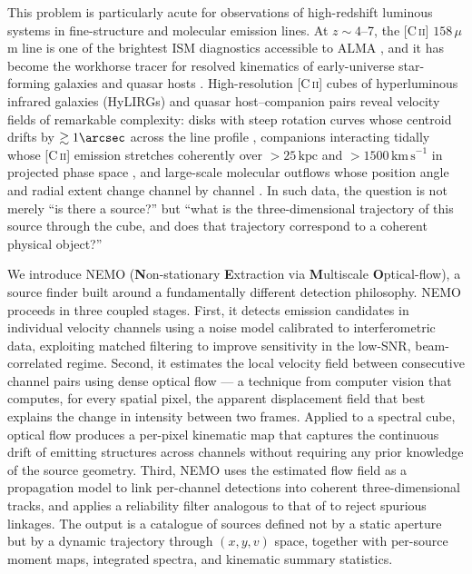 This problem is particularly acute for observations of high-redshift luminous systems in fine-structure and molecular emission lines. At $z \sim 4$--7, the [C\,\textsc{ii}] $158\,\mu$m line is one of the brightest ISM diagnostics accessible to ALMA \citep{Carilli2013}, and it has become the workhorse tracer for resolved kinematics of early-universe star-forming galaxies and quasar hosts \citep{Venemans2020, Decarli2021}. High-resolution [C\,\textsc{ii}] cubes of hyperluminous infrared galaxies (HyLIRGs) and quasar host--companion pairs reveal velocity fields of remarkable complexity: disks with steep rotation curves whose centroid drifts by $\gtrsim 1\arcsec$ across the line profile \citep{Venemans2020}, companions interacting tidally whose [C\,\textsc{ii}] emission stretches coherently over $>25\,\mathrm{kpc}$ and $>1500\,\mathrm{km\,s}^{-1}$ in projected phase space \citep{Decarli2021}, and large-scale molecular outflows whose position angle and radial extent change channel by channel \citep{Maiolino2012}. In such data, the question is not merely ``is there a source?'' but ``what is the three-dimensional trajectory of this source through the cube, and does that trajectory correspond to a coherent physical object?''

We introduce NEMO (\textbf{N}on-stationary \textbf{E}xtraction via \textbf{M}ultiscale \textbf{O}ptical-flow), a source finder built around a fundamentally different detection philosophy. NEMO proceeds in three coupled stages. First, it detects emission candidates in individual velocity channels using a noise model calibrated to interferometric data, exploiting matched filtering \citep{Loomis2018} to improve sensitivity in the low-SNR, beam-correlated regime. Second, it estimates the local velocity field between consecutive channel pairs using dense optical flow \citep{Horn1981, Lucas1981} --- a technique from computer vision that computes, for every spatial pixel, the apparent displacement field that best explains the change in intensity between two frames. Applied to a spectral cube, optical flow produces a per-pixel kinematic map that captures the continuous drift of emitting structures across channels without requiring any prior knowledge of the source geometry. Third, NEMO uses the estimated flow field as a propagation model to link per-channel detections into coherent three-dimensional tracks, and applies a reliability filter analogous to that of \citet{Serra2015} to reject spurious linkages. The output is a catalogue of sources defined not by a static aperture but by a dynamic trajectory through $(x, y, v)$ space, together with per-source moment maps, integrated spectra, and kinematic summary statistics.

